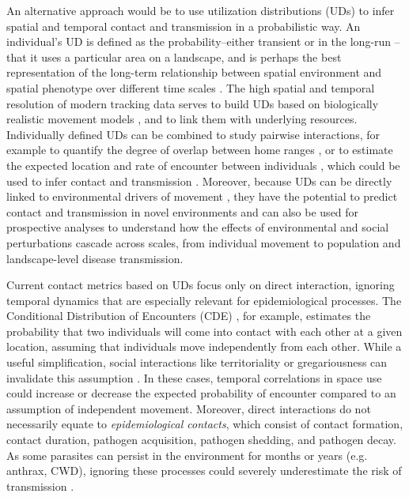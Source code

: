 \documentclass[letterpaper]{article}
\begin{document}
An alternative approach would be to use utilization distributions (UDs) to infer spatial and temporal contact and transmission in a probabilistic way. An individual's UD is defined as the probability--either transient or in the long-run \citep{Tao2016}--that it uses a particular area on a landscape, and is perhaps the best representation of the long-term relationship between spatial environment and spatial phenotype over different time scales \citet{Webber2023}. The high spatial and temporal resolution of modern tracking data serves to build UDs based on biologically realistic movement models \citep{Fleming2014,Gurarie2011,Potts2023}, and to link them with underlying resources.
Individually defined UDs can be combined to study pairwise interactions, for example to quantify the degree of overlap between home ranges \citep{Winner2018}, or to estimate the expected location and rate of encounter between individuals  \citep{Noonan2021}, which could be used to infer contact and transmission \citep{Godfrey2010, Godfrey2013}. 
Moreover, because UDs can be directly linked to environmental drivers of movement \citep{Signer2017}, they have the potential to predict contact and transmission in novel environments and can also be used for prospective analyses to understand how the effects of environmental and social perturbations cascade across scales, from individual movement to population and landscape-level disease transmission. 

Current contact metrics based on UDs focus only on direct interaction, ignoring temporal dynamics that are especially relevant for epidemiological processes. The Conditional Distribution of Encounters (CDE) \citep{Noonan2021}, for example, estimates the probability that two individuals will come into contact with each other at a given location, assuming that individuals move independently from each other.
While a useful simplification, social interactions like territoriality or gregariousness can invalidate this assumption  \citep{Manlove2018,Sah2018}. In these cases, temporal correlations in space use could increase or decrease the expected probability of encounter compared to an assumption of independent movement. 
Moreover, direct interactions do not necessarily equate to \emph{epidemiological contacts}, which consist of contact formation, contact duration, pathogen acquisition, pathogen shedding, and pathogen decay. As some parasites can persist in the environment for months or years (e.g. anthrax, CWD), ignoring these processes could severely underestimate the risk of transmission \citep{Wilber2022,Yang2023,Richardson2015}.
\end{document}
